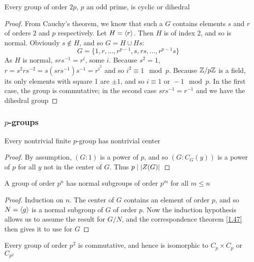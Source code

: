 \documentclass[11pt]{article}
\begin{document}
\begin{corollary}[]
Every group of order \(2p\), \(p\) an odd prime, is cyclic or dihedral
\end{corollary}

\begin{proof}
From Cauchy's theorem, we know that such a \(G\) contains elements \(s\) and \(r\) of
orders \(2\) and \(p\) respectively. Let \(H=\langle r\rangle\). Then \(H\) is of index 2, and so is normal.
Obviously \(s\notin H\), and so \(G=H\cup Hs\):
\begin{equation*}
G=\{1,r,\dots,r^{p-1},s,rs,\dots,r^{p-1}s\}
\end{equation*}
As \(H\) is normal, \(srs^{-1}=r^i\), some \(i\).
Because \(s^2=1\), \(r=s^2rs^{-2}=s(srs^{-1})s^{-1}=r^{i^2}\) and so \(i^2\equiv 1\mod p\).
Because \(\mathbb{Z}/p\mathbb{Z}\) is a field, its only elements with square 1 are \(\pm 1\), and
so \(i\equiv 1\text{ or }-1\mod p\). In the first case, the group is commutative; in the second
case \(srs^{-1}=r^{-1}\) and we have the dihedral group
\end{proof}

\subsubsection{\texorpdfstring{\(p\)}{p}-groups}
\label{sec:org38452ae}
\begin{theorem}[]
Every nontrivial finite \(p\)-group has nontrivial center
\end{theorem}

\begin{proof}
By assumption, \((G:1)\) is a power of \(p\), and so \((G:C_G(y))\) is a power of \(p\) for
all \(y\) not in the center of \(G\). Thus \(p\mid\abs{Z(G)}\)
\end{proof}

\begin{corollary}[]
A group of order \(p^n\) has normal subgroups of order \(p^m\) for all \(m\le n\)
\end{corollary}

\begin{proof}
Induction on \(n\). The center of \(G\) contains an element of order \(p\), and so \(N=\langle g\rangle\) is
a normal subgroup of \(G\) of order \(p\). Now the induction hypothesis allows us to assume the
result for \(G/N\), and the correspondence theorem \ref{1.47} then gives it to use for \(G\)
\end{proof}

\begin{proposition}[]
Every group of order \(p^2\) is commutative, and hence is isomorphic to \(C_p\times C_p\) or \(C_{p^2}\)
\end{proposition}
\end{document}
